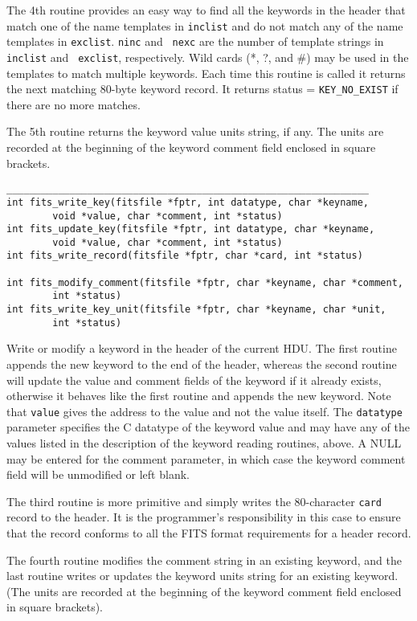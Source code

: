\documentclass[11pt]{article}
\begin{document}
The 4th routine provides an easy way to find all the keywords in the
header that match one of the name templates in {\tt inclist} and do not
match any of the name templates in {\tt exclist}.  {\tt ninc} and {\tt
nexc} are the number of template strings in {\tt inclist} and {\tt
exclist}, respectively.  Wild cards (*, ?, and \#) may be used in the
templates to match multiple keywords.  Each time this routine is called
it returns the next matching 80-byte keyword record.  It returns status
= {\tt KEY\_NO\_EXIST} if there are no more matches.

The 5th routine returns the keyword value units string, if any.
The units are recorded at the beginning of the keyword comment field
enclosed in square brackets.
\begin{verbatim}
_______________________________________________________________
int fits_write_key(fitsfile *fptr, int datatype, char *keyname, 
        void *value, char *comment, int *status)
int fits_update_key(fitsfile *fptr, int datatype, char *keyname,
        void *value, char *comment, int *status)
int fits_write_record(fitsfile *fptr, char *card, int *status)

int fits_modify_comment(fitsfile *fptr, char *keyname, char *comment,
        int *status)
int fits_write_key_unit(fitsfile *fptr, char *keyname, char *unit,
        int *status)

\end{verbatim}

Write or modify a keyword  in the header of the current HDU.  The
first routine appends the new keyword to the end of the header, whereas
the second routine will update the value and comment fields of the
keyword if it already exists, otherwise it behaves like the first
routine and appends the new keyword.  Note that {\tt value} gives the
address to the value and not the value itself.  The {\tt datatype}
parameter specifies the C datatype of the keyword value and may have
any of the values listed in the description of the keyword reading
routines, above.  A NULL may be entered for the comment parameter, in
which case the  keyword comment field will be unmodified or left
blank.

The third routine is more primitive and simply writes the 80-character
{\tt card} record to the header.  It is the programmer's responsibility
in this case to ensure that the record conforms to all the FITS format
requirements for a header record.

The fourth routine modifies the comment string in an existing keyword,
and the last routine writes or updates the keyword units string for an
existing keyword.  (The units are recorded at the beginning of the
keyword comment field enclosed in square brackets).
\end{document}
